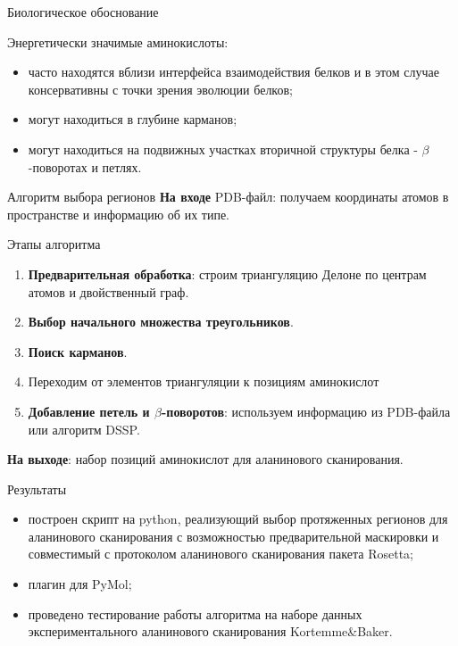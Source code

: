 \documentclass[12pt, xcolor={dvipsnames}]{beamer}
\begin{document}
\begin{frame}{Биологическое обоснование}
\begin{block}{Энергетически значимые аминокислоты:}
\begin{itemize}
\item часто находятся вблизи интерфейса взаимодействия белков и в этом случае  консервативны с точки зрения эволюции белков;
\item могут находиться в глубине карманов;
\item могут находиться на подвижных участках вторичной структуры белка - $\beta$-поворотах и петлях.
\end{itemize}
\end{block}
\end{frame}
\begin{frame}{Алгоритм выбора регионов}
\textbf{На входе} {PDB-файл}: получаем координаты атомов в пространстве и информацию об их типе.
\begin{block}{Этапы алгоритма}
\begin{enumerate}
\item \textbf{Предварительная обработка}: строим триангуляцию Делоне по центрам атомов и двойственный граф. 
\item \textbf{Выбор начального множества треугольников}.
\item \textbf{Поиск карманов}.
\item Переходим от элементов триангуляции к позициям аминокислот
\item \textbf{Добавление петель и $\beta$-поворотов}: используем информацию из PDB-файла или алгоритм DSSP.
\end{enumerate}

\end{block}
 \textbf{На выходе}: набор позиций аминокислот для аланинового сканирования.
\end{frame}
\begin{frame}{Результаты}
\begin{itemize}
\item построен скрипт на python, реализующий выбор протяженных регионов для аланинового сканирования с возможностью предварительной маскировки и совместимый с протоколом аланинового сканирования пакета Rosetta;
\item плагин для PyMol;
\item проведено тестирование работы алгоритма на наборе данных экспериментального аланинового сканирования Kortemme\&Baker.
\end{itemize}
\end{frame}
\end{document}
